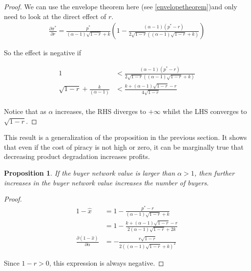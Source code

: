 \documentclass[12pt]{article}
\newtheorem{proposition}{Proposition}
\numberwithin{equation}{section}
\begin{document}
\begin{proof}
We can use the envelope theorem here (see \ref{envelopetheorem})and only need to look at the direct effect of $r$.
\begin{align*}
\frac{\partial \pi^* }{\partial r}
=
\frac{p^*}{(\alpha-1) \sqrt{1-r}+k} \left(1-\frac{(\alpha-1) (p^*-r)}{2 \sqrt{1-r} \left((\alpha-1) \sqrt{1-r}+k\right)}\right)
\end{align*}

So the effect is negative if 

\begin{align*}
1&<\frac{(\alpha-1) (p^*-r)}{2 \sqrt{1-r} \left((\alpha-1) \sqrt{1-r}+k\right)} \\
\sqrt{1-r}+ \frac{k}{(\alpha-1) }  &< \frac{k+ (\alpha-1)\sqrt{ 1 -r }-r}{4 \sqrt{1-r} } \\
\end{align*}

Notice that as $\alpha$ increases, the RHS diverges to $+\infty$ whilst the LHS converges to $\sqrt{1-r}$.  
\end{proof}

This result is a generalization of the proposition in the previous section. It shows that even if the cost of piracy is not high or zero, it can be marginally true that decreasing product degradation increases profits. 

\begin{proposition}
If the buyer network value is larger than $\alpha>1$, then further increases in the buyer network value increases the number of buyers. 
\end{proposition}

\begin{proof}
\begin{align*}
1 - \hat{x}&= 1 - \frac{p^*-r}{(\alpha - 1) \sqrt{1-r} +k} \\
&= 1 - \frac{k+ (\alpha-1)\sqrt{ 1 -r }-r}{2(\alpha - 1) \sqrt{1-r} +2k} \\
\frac{\partial (1 - \hat{x})}{\partial \alpha}
&=-\frac{ r\sqrt{1-r} }{2 \left((\alpha-1) \sqrt{1-r}+k\right)^2} 
\end{align*}

Since $1-r>0$, this expression is always negative. 

\end{proof}
\end{document}
